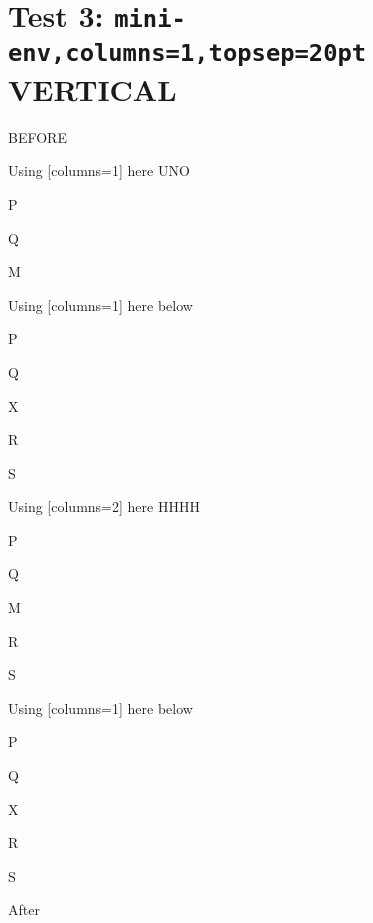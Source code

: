 \documentclass[10pt]{article}
\begin{document}
\section{Test 3: \texttt{mini-env,columns=1,topsep=20pt} VERTICAL}

BEFORE
\begin{enumext}[columns=2]
\item Using [columns=1] here UNO

  \begin{enumext}[columns=1,topsep=20pt]%
     \item  P \item Q \item M %
  \end{enumext}

\item Using [columns=1] here below

\begin{enumext}[columns=1,topsep=20pt]%
     \item  P \item Q \item X  \item R \item S
  \end{enumext}

\columnbreak

\item Using [columns=2] here HHHH

  \begin{enumext}[columns=2,topsep=20pt]%
    \item  P \item Q \item M \item R \item S
  \end{enumext}

\item Using [columns=1] here below

\begin{enumext}[columns=1,topsep=20pt]%
     \item  P \item Q \item X  \item R \item S
  \end{enumext}

\end{enumext}
After
\end{document}
